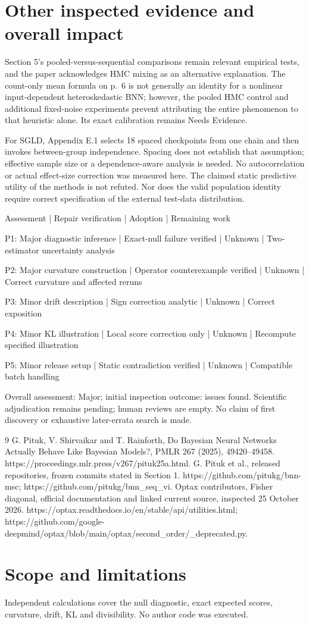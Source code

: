 \documentclass[10pt]{article}
\begin{document}
\section*{Other inspected evidence and overall impact}
Section 5’s pooled-versus-sequential comparisons remain relevant empirical tests, and the paper acknowledges HMC mixing as an alternative explanation. The count-only mean formula on p. 6 is not generally an identity for a nonlinear input-dependent heteroskedastic BNN; however, the pooled HMC control and additional fixed-noise experiments prevent attributing the entire phenomenon to that heuristic alone. Its exact calibration remains Needs Evidence.\par
For SGLD, Appendix E.1 selects 18 spaced checkpoints from one chain and then invokes between-group independence. Spacing does not establish that assumption; effective sample size or a dependence-aware analysis is needed. No autocorrelation or actual effect-size correction was measured here. The claimed static predictive utility of the methods is not refuted. Nor does the valid population identity require correct specification of the external test-data distribution.\par
Assessment | Repair verification | Adoption | Remaining work\par
P1: Major diagnostic inference | Exact-null failure verified | Unknown | Two-estimator uncertainty analysis\par
P2: Major curvature construction | Operator counterexample verified | Unknown | Correct curvature and affected reruns\par
P3: Minor drift description | Sign correction analytic | Unknown | Correct exposition\par
P4: Minor KL illustration | Local score correction only | Unknown | Recompute specified illustration\par
P5: Minor release setup | Static contradiction verified | Unknown | Compatible batch handling\par
Overall assessment: Major; initial inspection outcome: issues found. Scientific adjudication remains pending; human reviews are empty. No claim of first discovery or exhaustive later-errata search is made.\par
9 G. Pituk, V. Shirvaikar and T. Rainforth, Do Bayesian Neural Networks Actually Behave Like Bayesian Models?, PMLR 267 (2025), 49420–49458. https://proceedings.mlr.press/v267/pituk25a.html. G. Pituk et al., released repositories, frozen commits stated in Section 1. https://github.com/pitukg/bnn-msc; https://github.com/pitukg/bnn\_seq\_vi. Optax contributors, Fisher diagonal, official documentation and linked current source, inspected 25 October 2026. https://optax.readthedocs.io/en/stable/api/utilities.html; https://github.com/google-deepmind/optax/blob/main/optax/second\_order/\_deprecated.py.\par
\section*{Scope and limitations}
Independent calculations cover the null diagnostic, exact expected scores, curvature, drift, KL and divisibility. No author code was executed.\par
\end{document}

